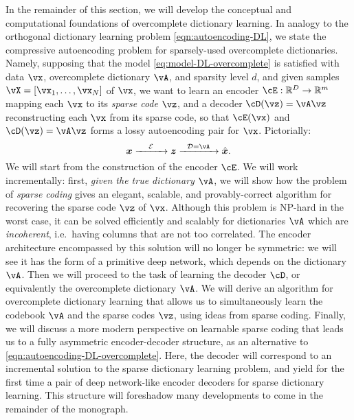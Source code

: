 \documentclass[../../book-main.tex]{subfiles}
\begin{document}
In the remainder of this section, we will develop the conceptual and computational foundations of overcomplete dictionary learning.
In analogy to the orthogonal dictionary learning problem \eqref{eqn:autoencoding-DL}, we state the compressive autoencoding problem for sparsely-used overcomplete dictionaries. Namely, supposing that the model \eqref{eq:model-DL-overcomplete} is satisfied with data \(\vx\), overcomplete dictionary \(\vA\), and sparsity level \(d\), and given samples \(\vX = [\vx_1, \dots, \vx_N]\) of \(\vx\), we want to learn an encoder \(\cE : \R^D \to \R^m\) mapping each \(\vx\) to its \textit{sparse code} \(\vz\), and a decoder \(\cD(\vz) = \vA \vz\) reconstructing each \(\vx\) from its sparse code, so that \(\cE(\vx)\) and \(\cD(\vz) = \vA\vz\) forms a lossy autoencoding pair for \(\vx\). Pictorially:
\begin{equation}
\x \xrightarrow{\hspace{4mm} \mathcal{E} \hspace{4mm}}  \z \xrightarrow{\hspace{2mm} \mathcal{D} = \vA \hspace{2mm}}   \hat{\x}.  
\label{eqn:autoencoding-DL-overcomplete}
\end{equation}    
We will start from the construction of the encoder $\cE$.
We will work incrementally: first, \textit{given the true dictionary $\vA$}, we will show how the problem of \textit{sparse coding} gives an elegant, scalable, and provably-correct algorithm for recovering the sparse code $\vz$ of $\vx$.
Although this problem is NP-hard in the worst case, it can be solved efficiently and scalably for dictionaries $\vA$ which are \textit{incoherent}, i.e.\ having columns that are not too correlated.
The encoder architecture encompassed by this solution will no longer be symmetric: we will see it has the form of a primitive deep network, which depends on the dictionary $\vA$.
Then we will proceed to the task of learning the decoder $\cD$, or equivalently the overcomplete dictionary $\vA$.
We will derive an algorithm for overcomplete dictionary learning that allows us 
to simultaneously learn the codebook $\vA$ and the sparse codes $\vz$, using ideas from sparse coding.
Finally, we will discuss a more modern perspective on learnable sparse coding that leads us to a fully asymmetric encoder-decoder structure, as an alternative to \eqref{eqn:autoencoding-DL-overcomplete}.
Here, the decoder will correspond to an incremental solution to the sparse dictionary learning problem, and yield for the first time a pair of deep network-like encoder decoders for sparse dictionary learning.
This structure will foreshadow many developments to come in the remainder of the monograph.
\end{document}
